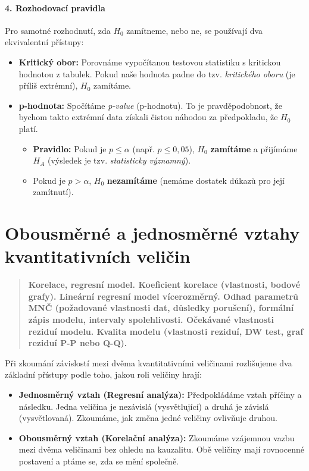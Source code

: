 \paragraph*{4. Rozhodovací pravidla}
Pro samotné rozhodnutí, zda $H_0$ zamítneme, nebo ne, se používají dva ekvivalentní přístupy:
\begin{itemize}
    \item \textbf{Kritický obor:} Porovnáme vypočítanou testovou statistiku s kritickou hodnotou z tabulek. Pokud naše hodnota padne do tzv. \textit{kritického oboru} (je příliš extrémní), $H_0$ zamítáme.
    \item \textbf{p-hodnota:} Spočítáme \textit{p-value} (p-hodnotu). To je pravděpodobnost, že bychom takto extrémní data získali čistou náhodou za předpokladu, že $H_0$ platí.
    \begin{itemize}
        \item \textbf{Pravidlo:} Pokud je $p \leq \alpha$ (např. $p \leq 0,05$), $H_0$ \textbf{zamítáme} a přijímáme $H_A$ (výsledek je tzv. \textit{statisticky významný}).
        \item Pokud je $p > \alpha$, $H_0$ \textbf{nezamítáme} (nemáme dostatek důkazů pro její zamítnutí).
    \end{itemize}
\end{itemize}

\section{Obousměrné a jednosměrné vztahy kvantitativních veličin}
\begin{quote}
    \textbf{Korelace, regresní model. Koeficient korelace (vlastnosti, bodové grafy). Lineární regresní model vícerozměrný. Odhad parametrů MNČ (požadované vlastnosti dat, důsledky porušení), formální zápis modelu, intervaly spolehlivosti. Očekávané vlastnosti reziduí modelu. Kvalita modelu (vlastnosti reziduí, DW test, graf reziduí P-P nebo Q-Q).}
\end{quote}

Při zkoumání závislostí mezi dvěma kvantitativními veličinami rozlišujeme dva základní přístupy podle toho, jakou roli veličiny hrají:
\begin{itemize}
    \item \textbf{Jednosměrný vztah (Regresní analýza):} Předpokládáme vztah příčiny a následku. Jedna veličina je nezávislá (vysvětlující) a druhá je závislá (vysvětlovaná). Zkoumáme, jak změna jedné veličiny ovlivňuje druhou.
    \item \textbf{Obousměrný vztah (Korelační analýza):} Zkoumáme vzájemnou vazbu mezi dvěma veličinami bez ohledu na kauzalitu. Obě veličiny mají rovnocenné postavení a ptáme se, zda se mění společně.
\end{itemize}

